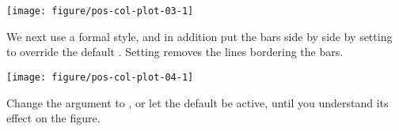 \documentclass[krantz2]{krantz}\usepackage{knitr}%
\begin{document}
\begin{knitrout}\footnotesize
{}\color{fgcolor}\begin{kframe}
\begin{alltt}
 \hlstd{(}      \hlopt{+}
     \hlstd{(} \hlstd{=} \hlstd{,}  \hlstd{=} \hlstd{)} \hlopt{+}
     \hlstd{()} \hlopt{+} \hlstd{()}
\end{alltt}
\end{kframe}

{\centering \texttt{[image: figure/pos-col-plot-03-1]} 

}



\end{knitrout}

We next use a formal style, and in addition put the bars side by side by setting  to override the default . Setting  removes the lines bordering the bars.

\begin{knitrout}\footnotesize
{}\color{fgcolor}\begin{kframe}
\begin{alltt}
 \hlstd{(}      \hlopt{+}
     \hlstd{(} \hlstd{=} \hlstd{,}  \hlstd{=} \hlstd{)} \hlopt{+}
     \hlstd{()} \hlopt{+} \hlstd{()}
\end{alltt}
\end{kframe}

{\centering \texttt{[image: figure/pos-col-plot-04-1]} 

}



\end{knitrout}

\begin{playground}
Change the argument to , or let the default be active, until you understand its effect on the figure.
\end{playground}
\end{document}
